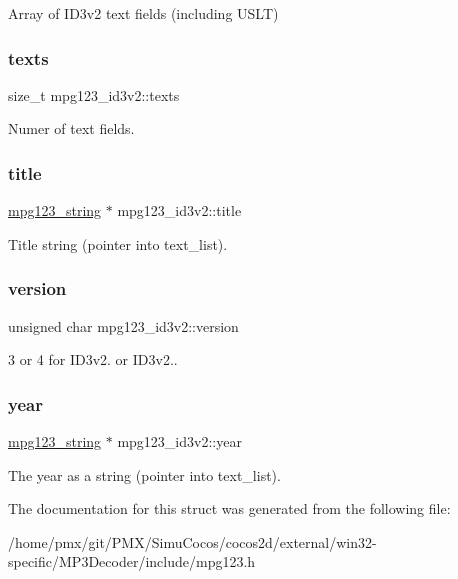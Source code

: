 Array of I\+D3v2 text fields (including U\+S\+LT) \mbox{\label{structmpg123__id3v2_a1ea43150e210d554f297bc317d5fb8ea}} 
\subsubsection{\texorpdfstring{texts}{texts}}
{\footnotesize\ttfamily size\+\_\+t mpg123\+\_\+id3v2\+::texts}

Numer of text fields. \mbox{\label{structmpg123__id3v2_ae911d27158f516c967792f3eae2bfcca}} 
\subsubsection{\texorpdfstring{title}{title}}
{\footnotesize\ttfamily \hyperlink{structmpg123__string}{mpg123\+\_\+string} $\ast$ mpg123\+\_\+id3v2\+::title}

Title string (pointer into text\+\_\+list). \mbox{\label{structmpg123__id3v2_ab64e67e2d2bc5cc0b45e9598a8d386d6}} 
\subsubsection{\texorpdfstring{version}{version}}
{\footnotesize\ttfamily unsigned char mpg123\+\_\+id3v2\+::version}

3 or 4 for I\+D3v2. or I\+D3v2.. \mbox{\label{structmpg123__id3v2_a323e61ee86cc7a2d0d889c78be8c8c9f}} 
\subsubsection{\texorpdfstring{year}{year}}
{\footnotesize\ttfamily \hyperlink{structmpg123__string}{mpg123\+\_\+string} $\ast$ mpg123\+\_\+id3v2\+::year}

The year as a string (pointer into text\+\_\+list). 

The documentation for this struct was generated from the following file\+:\begin{DoxyCompactItemize}
\item 
/home/pmx/git/\+P\+M\+X/\+Simu\+Cocos/cocos2d/external/win32-\/specific/\+M\+P3\+Decoder/include/mpg123.\+h\end{DoxyCompactItemize}
